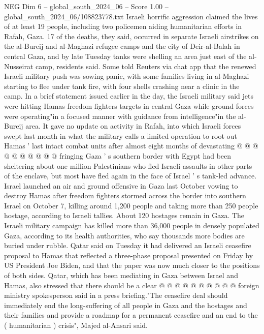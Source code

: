 \begin{textsample}{NEG Dim 6 – global\_south\_2024\_06 – Score 1.00 – global\_south\_2024\_06/108823778.txt}  \label{ex:f6_neg_301}
Israeli horrific aggression claimed the lives of at least 19 people, including two policemen aiding humanitarian efforts in Rafah, Gaza. 17 of the deaths, they said, occurred in separate Israeli airstrikes on the al-Bureij and al-Maghazi refugee camps and the city of Deir-al-Balah in central Gaza, and by late Tuesday tanks were shelling an area just east of the al-Nusseirat camp, residents said.
Some told Reuters via chat app that the renewed Israeli military push was sowing panic, with some families living in al-Maghazi starting to flee under tank fire, with four shells crashing near a clinic in the camp.
In a brief statement issued earlier in the day, the Israeli military said jets were hitting Hamas freedom fighters targets in central Gaza while ground forces were operating"in a focused manner with guidance from intelligence"in the al-Bureij area.
It gave no update on activity in Rafah, into which Israeli forces swept last month in what the military calls a limited operation to root out Hamas ' last intact combat units after almost eight months of devastating @ @ @ @ @ @ @ @ @ @ fringing Gaza ' s southern border with Egypt had been sheltering about one million Palestinians who fled Israeli assaults in other parts of the enclave, but most have fled again in the face of Israel ' s tank-led advance.
Israel launched an air and ground offensive in Gaza last October vowing to destroy Hamas after freedom fighters stormed across the border into southern Israel on October 7, killing around 1,200 people and taking more than 250 people hostage, according to Israeli tallies.
About 120 hostages remain in Gaza.
The Israeli military campaign has killed more than 36,000 people in densely populated Gaza, according to its health authorities, who say thousands more bodies are buried under rubble.
Qatar said on Tuesday it had delivered an Israeli ceasefire proposal to Hamas that reflected a three-phase proposal presented on Friday by US President Joe Biden, and that the paper was now much closer to the positions of both sides.
Qatar, which has been mediating in Gaza between Israel and Hamas, also stressed that there should be a clear @ @ @ @ @ @ @ @ @ @ foreign ministry spokesperson said in a press briefing."The ceasefire deal should immediately end the long-suffering of all people in Gaza and the hostages and their families and provide a roadmap for a permanent ceasefire and an end to the ( humanitarian ) crisis", Majed al-Ansari said.

\end{textsample}
